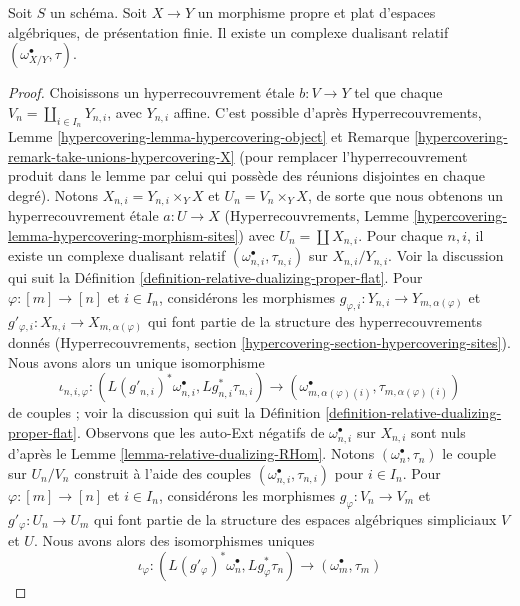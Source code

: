 \begin{lemma}
\label{lemma-existence-relative-dualizing}
Soit $S$ un schéma. Soit $X \to Y$ un morphisme propre et plat
d'espaces algébriques, de présentation finie.
Il existe un complexe dualisant relatif $(\omega_{X/Y}^\bullet, \tau)$.
\end{lemma}

\begin{proof}
Choisissons un hyperrecouvrement \'etale $b : V \to Y$ tel que chaque
$V_n = \coprod_{i \in I_n} Y_{n, i}$, avec $Y_{n, i}$ affine.
C'est possible d'après Hyperrecouvrements, Lemme
\ref{hypercovering-lemma-hypercovering-object} et
Remarque \ref{hypercovering-remark-take-unions-hypercovering-X}
(pour remplacer l'hyperrecouvrement produit
dans le lemme par celui qui possède des réunions disjointes en chaque degré).
Notons $X_{n, i} = Y_{n, i} \times_Y X$ et $U_n = V_n \times_Y X$,
de sorte que nous obtenons un hyperrecouvrement \'etale
$a : U \to X$ (Hyperrecouvrements, Lemme
\ref{hypercovering-lemma-hypercovering-morphism-sites})
avec $U_n = \coprod X_{n, i}$.
Pour chaque $n, i$, il existe un complexe dualisant relatif
$(\omega_{n, i}^\bullet, \tau_{n, i})$ sur $X_{n, i}/Y_{n, i}$.
Voir la discussion qui suit la
Définition \ref{definition-relative-dualizing-proper-flat}.
Pour $\varphi : [m] \to [n]$ et $i \in I_n$, considérons les morphismes
$g_{\varphi, i} : Y_{n, i} \to Y_{m, \alpha(\varphi)}$ et
$g'_{\varphi, i} : X_{n, i} \to X_{m, \alpha(\varphi)}$
qui font partie de la structure des hyperrecouvrements donnés
(Hyperrecouvrements, section \ref{hypercovering-section-hypercovering-sites}).
Nous avons alors un unique isomorphisme
$$
\iota_{n, i, \varphi} :
(L(g'_{n, i})^*\omega_{n, i}^\bullet, Lg_{n, i}^*\tau_{n, i})
\longrightarrow
(\omega_{m, \alpha(\varphi)(i)}^\bullet, \tau_{m, \alpha(\varphi)(i)})
$$
de couples ; voir la discussion qui suit la
Définition \ref{definition-relative-dualizing-proper-flat}.
Observons que les auto-Ext négatifs de $\omega_{n, i}^\bullet$
sur $X_{n, i}$ sont nuls d'après le Lemme \ref{lemma-relative-dualizing-RHom}.
Notons $(\omega_n^\bullet, \tau_n)$ le couple sur $U_n/V_n$ construit à l'aide
des couples $(\omega_{n, i}^\bullet, \tau_{n, i})$ pour $i \in I_n$.
Pour $\varphi : [m] \to [n]$ et $i \in I_n$, considérons les morphismes
$g_\varphi : V_n \to V_m$ et $g'_\varphi : U_n \to U_m$ qui font partie
de la structure des espaces algébriques simpliciaux $V$ et $U$.
Nous avons alors des isomorphismes uniques
$$
\iota_\varphi :
(L(g'_\varphi)^*\omega_n^\bullet, Lg_\varphi^*\tau_n)
\longrightarrow
(\omega_m^\bullet, \tau_m)
$$
\end{proof}
